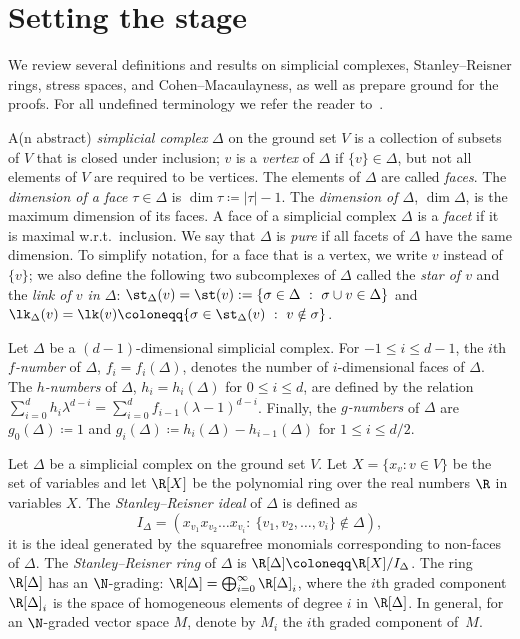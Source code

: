 
\section{Setting the stage}
We review several definitions and results on simplicial complexes, Stanley--Reisner rings, stress spaces, and Cohen--Macaulayness, as well as prepare ground for the proofs. For all undefined terminology we refer the reader to~\cite{Lee96, Stanley96}.

A(n abstract) \emph{simplicial complex} $\Delta$ on the ground set $V$ is a collection of subsets of $V$ that is closed under inclusion; $v$ is a \emph{vertex} of $\Delta$ if $\{v\}\in \Delta$, but not all elements of $V$ are required to be vertices. The elements of $\Delta$ are called \emph{faces}. The \emph{dimension of a face} $\tau\in\Delta$ is $\dim\tau\coloneqq |\tau|-1$. The \emph{dimension of $\Delta$}, $\dim\Delta$, is the maximum dimension of its faces. A face of a simplicial complex $\Delta$ is a \emph{facet} if it is maximal w.r.t.~inclusion. We say that $\Delta$ is \emph{pure} if all facets of $\Delta$ have the same dimension. To simplify notation, for a face that is a vertex, we write $v$ instead of $\{v\}$; we also define the following two subcomplexes of $\Delta$ called the \emph{star of $v$} and the \emph{link of $v$ in $\Delta$}:
$\st_\Delta(v)=\st(v):=\{\sigma\in\Delta \ : \ \sigma\cup v\in\Delta\}$ and $\lk_\Delta(v)=\lk(v)\coloneqq  \{\sigma\in \st_\Delta(v) \ : \ v\notin\sigma\}$.


Let $\Delta$ be a $(d-1)$-dimensional simplicial complex. For $-1 \leq i \leq d-1$, the $i$th \emph{$f$-number} of $\Delta$, $f_i = f_i(\Delta)$, denotes the number of $i$-dimensional faces of $\Delta$. The \emph{$h$-numbers} of $\Delta$, $h_i=h_i(\Delta)$ for $0 \leq i \leq d$, are defined by the relation $\sum_{i=0}^{d}h_i\lambda^{d-i}=\sum_{i=0}^{d}f_{i-1}(\lambda-1)^{d-i}$. Finally, the \emph{$g$-numbers} of $\Delta$ are $g_0(\Delta)\coloneqq 1$ and $g_i(\Delta)\coloneqq h_i(\Delta)-h_{i-1}(\Delta)$ for $1 \leq i \leq d/2$.



Let $\Delta$ be a simplicial complex on the ground set $V$. Let $X = \{x_v : v \in V\}$ be the set of variables and let $\R[X]$ be the polynomial ring over the real numbers $\R$ in variables $X$. The \emph{Stanley--Reisner ideal} of $\Delta$ is defined as 
\[
I_\Delta=\left(x_{v_1}x_{v_2}\dots x_{v_i}: \ \{v_1, v_2, \dots, v_i\}\notin \Delta\right),
\] 
\ie
it is the ideal generated by the squarefree monomials corresponding to non-faces of $\Delta$. The \emph{Stanley--Reisner ring} of $\Delta$ is $\R[\Delta] \coloneqq  \R[X]/I_\Delta$. The ring $\R[\Delta]$ has an $\N$-grading: $\R[\Delta]= \bigoplus_{i=0}^{\infty} \R[\Delta]_i$, where the $i$th graded component $\R[\Delta]_i$ is the space of homogeneous elements of degree $i$ in $\R[\Delta]$. In general, for an $\N$-graded vector space $M$, denote by $M_i$ the $i$th graded component of~$M$.

